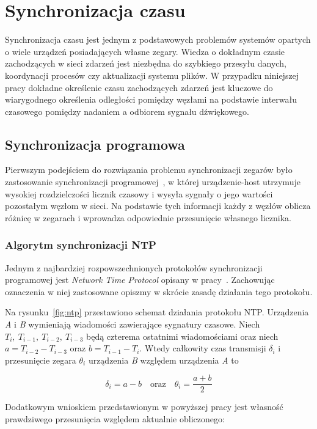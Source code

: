\chapter{Synchronizacja czasu}

Synchronizacja czasu jest jednym z podstawowych problemów systemów opartych o wiele urządzeń posiadających własne zegary. Wiedza o dokładnym czasie zachodzących w sieci zdarzeń jest niezbędna do szybkiego przesyłu danych, koordynacji procesów czy aktualizacji systemu plików. W przypadku niniejszej pracy dokładne określenie czasu zachodzących zdarzeń jest kluczowe do wiarygodnego określenia odległości pomiędzy węzłami na podstawie interwału czasowego pomiędzy nadaniem a odbiorem sygnału dźwiękowego.

\section{Synchronizacja programowa}

Pierwszym podejściem do rozwiązania problemu synchronizacji zegarów było zastosowanie synchronizacji programowej~\cite{6066334}, w której urządzenie-host utrzymuje wysokiej rozdzielczości licznik czasowy i wysyła sygnały o jego wartości pozostałym węzłom w sieci. Na podstawie tych informacji każdy z węzłów oblicza różnicę w zegarach i wprowadza odpowiednie przesunięcie własnego licznika.

\subsection{Algorytm synchronizacji NTP}

Jednym z najbardziej rozpowszechnionych protokołów synchronizacji programowej jest \textit{Network Time Protocol} opisany w pracy~\cite{103043}. Zachowując oznaczenia w niej zastosowane opiszmy w skrócie zasadę działania tego protokołu.

Na rysunku~\ref{fig:ntp} przestawiono schemat działania protokołu NTP. Urządzenia \textit{A} i \textit{B} wymieniają wiadomości zawierające sygnatury czasowe. Niech $T_{i},\ T_{i-1},\ T_{i-2},\ T_{i-3}$ będą czterema ostatnimi wiadomościami oraz niech $a = T_{i-2} - T_{i-3}$ oraz $b = T_{i-1} - T_i$. Wtedy całkowity czas transmisji $\delta_i$ i przesunięcie zegara $\theta_i$ urządzenia \textit{B} względem urządzenia \textit{A} to

\[\delta_i = a - b\quad \text{oraz}\quad \theta_i = \frac{a+b}{2}\]

Dodatkowym wnioskiem przedstawionym w powyższej pracy jest własność prawdziwego przesunięcia względem aktualnie obliczonego:

